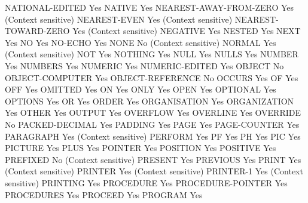 NATIONAL-EDITED                 Yes
NATIVE                          Yes
NEAREST-AWAY-FROM-ZERO          Yes (Context sensitive)
NEAREST-EVEN                    Yes (Context sensitive)
NEAREST-TOWARD-ZERO             Yes (Context sensitive)
NEGATIVE                        Yes
NESTED                          Yes
NEXT                            Yes
NO                              Yes
NO-ECHO                         Yes
NONE                            No (Context sensitive)
NORMAL                          Yes (Context sensitive)
NOT                             Yes
NOTHING                         Yes
NULL                            Yes
NULLS                           Yes
NUMBER                          Yes
NUMBERS                         Yes
NUMERIC                         Yes
NUMERIC-EDITED                  Yes
OBJECT                          No
OBJECT-COMPUTER                 Yes
OBJECT-REFERENCE                No
OCCURS                          Yes
OF                              Yes
OFF                             Yes
OMITTED                         Yes
ON                              Yes
ONLY                            Yes
OPEN                            Yes
OPTIONAL                        Yes
OPTIONS                         Yes
OR                              Yes
ORDER                           Yes
ORGANISATION                    Yes
ORGANIZATION                    Yes
OTHER                           Yes
OUTPUT                          Yes
OVERFLOW                        Yes
OVERLINE                        Yes
OVERRIDE                        No
PACKED-DECIMAL                  Yes
PADDING                         Yes
PAGE                            Yes
PAGE-COUNTER                    Yes
PARAGRAPH                       Yes (Context sensitive)
PERFORM                         Yes
PF                              Yes
PH                              Yes
PIC                             Yes
PICTURE                         Yes
PLUS                            Yes
POINTER                         Yes
POSITION                        Yes
POSITIVE                        Yes
PREFIXED                        No (Context sensitive)
PRESENT                         Yes
PREVIOUS                        Yes
PRINT                           Yes (Context sensitive)
PRINTER                         Yes (Context sensitive)
PRINTER-1                       Yes (Context sensitive)
PRINTING                        Yes
PROCEDURE                       Yes
PROCEDURE-POINTER               Yes
PROCEDURES                      Yes
PROCEED                         Yes
PROGRAM                         Yes
